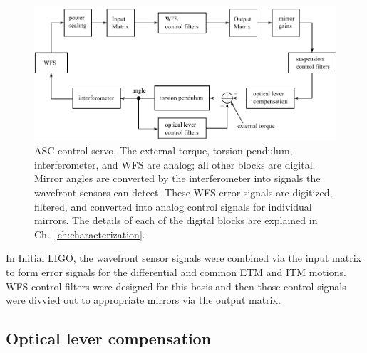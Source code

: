 \begin{figure} \begin{centering} 
\includegraphics{figures/ASCcontrolservo.pdf} 
\caption[ASC control servo]{ASC control servo. The external torque, torsion pendulum, interferometer, and WFS are analog; all other blocks are digital. Mirror angles are converted by the interferometer into signals the wavefront sensors can detect. These WFS error signals are digitized, filtered, and converted into analog control signals for individual mirrors. The details of each of the digital blocks are explained in Ch.~\ref{ch:characterization}.}
\label{fig:ASCcontrolservo}
\end{centering}
\end{figure}

In Initial LIGO, the wavefront sensor signals were combined via the input matrix to form error signals for the differential and common ETM and ITM motions.
WFS control filters were designed for this basis and then those control signals were divvied out to appropriate mirrors via the output matrix. 



\subsection{Optical lever compensation}

